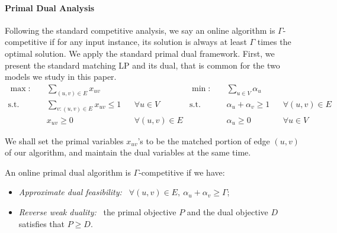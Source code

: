 \paragraph{Primal Dual Analysis} Following the standard competitive analysis, we say an online algorithm is $\Gamma$-competitive if for any input instance, its solution is always at least $\Gamma$ times the optimal solution. We apply the standard primal dual framework. First, we present the standard matching LP and its dual, that is common for the two models we study in this paper.
\begin{align*}
\max: \quad & \textstyle \sum_{(u,v)\in E} x_{uv} && \qquad\qquad & \min: \quad & \textstyle\sum_{u \in V} \alpha_u\\
\text{s.t.} \quad & \textstyle \sum_{v:(u,v)\in E} x_{uv} \leq 1 && \forall u\in V & \text{s.t.} \quad & \alpha_u + \alpha_v \geq 1 && \forall (u,v)\in E \\
& x_{uv} \geq 0 && \forall (u,v)\in E & & \alpha_u \geq 0 && \forall u \in V
\end{align*}

We shall set the primal variables $x_{uv}$'s to be the matched portion of edge $(u,v)$ of our algorithm, and maintain the dual variables at the same time.
\begin{lemma}%
    \label{lem:primal-dual}
    An online primal dual algorithm is $\Gamma$-competitive if we have:
    \begin{itemize}
        \item \emph{Approximate dual feasibility:~}
            $\forall (u, v) \in E,~\alpha_u + \alpha_v \ge \Gamma$;
        \item \emph{Reverse weak duality:~} the primal objective $P$ and the dual objective $D$ satisfies that $P \ge D $.
    \end{itemize}
\end{lemma}
